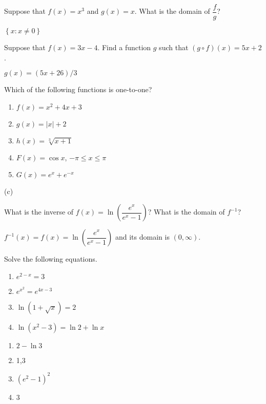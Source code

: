 \begin{enumialphparenastyle}
\begin{ex}
Suppose that $f(x)=x^3$ and $g(x)=x$. What is the domain of $\dfrac{f}{g}$?
\begin{sol}
	$\left\{x:x\neq 0\right\}$
\end{sol}
\end{ex}


\begin{ex}
Suppose that $f(x)=3x-4$. Find a
function $g$ such that $(g\circ f)(x)=5x+2$.
\begin{sol}
	$g(x)=(5x+26)/3$
\end{sol}
\end{ex}


\begin{ex}
Which of the following functions is one-to-one?
\begin{enumerate}
	\item	$f(x)=x^2+4x+3$
	\item	$g(x)=\vert x\vert+2$
	\item	$h(x)=\sqrt[3]{x+1}$
	\item	$F(x)=\cos x$, $-\pi\leq x\leq\pi$
	\item	$G(x)=e^x+e^{-x}$
\end{enumerate} 
\begin{sol}
	(c)
\end{sol}
\end{ex}


\begin{ex}
What is the inverse of $f(x)=\ln\left(\dfrac{e^x}{e^x-1}\right)$? What is the domain of $f^{-1}$?
\begin{sol}
	$f^{-1}(x)=f(x)=\ln\left(\dfrac{e^x}{e^x-1}\right)$ and its domain is $(0,\infty)$.
\end{sol}
\end{ex}


\begin{ex}
Solve the following equations.
\begin{enumerate}
	\item	$e^{2-x}=3$
	\item	$e^{x^2}=e^{4x-3}$
	\item	$\ln\left(1+\sqrt{x}\right)=2$
	\item	$\ln(x^2-3)=\ln 2+\ln x$
\end{enumerate}
\begin{sol}
\begin{enumerate}
	\item	$2-\ln 3$
	\item	1,3
	\item	$(e^2-1)^2$
	\item	3
\end{enumerate}
\end{sol}
\end{ex}



\end{enumialphparenastyle}
